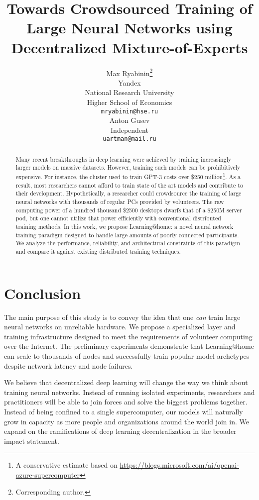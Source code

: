 \documentclass{article}
\title{Towards Crowdsourced Training of Large Neural Networks using Decentralized Mixture-of-Experts}
\author{%
  Max Ryabinin\thanks{Corresponding author.} \\
  Yandex\\
  National Research University\\
  Higher School of Economics\\
  \texttt{mryabinin@hse.ru} \\
  \And
  Anton Gusev \\
  Independent \\
  \texttt{uartman@mail.ru} \\
}
\begin{document}
\maketitle

\vspace{-4px}
\begin{abstract}
Many recent breakthroughs in deep learning were achieved by training increasingly larger models on massive datasets. However, training such models can be prohibitively expensive. For instance, the cluster used to train GPT-3 costs over \$250 million\footnote{\hspace{-2px}A conservative estimate based on \url{https://blogs.microsoft.com/ai/openai-azure-supercomputer}}. As a result, most researchers cannot afford to train state of the art models and contribute to their development. Hypothetically, a researcher could crowdsource the training of large neural networks with thousands of regular PCs provided by volunteers. The raw computing power of a hundred thousand \$2500 desktops dwarfs that of a \$250M server pod, but one cannot utilize that power efficiently with conventional distributed training methods. In this work, we propose Learning@home: a novel neural network training paradigm designed to handle large amounts of poorly connected participants. We analyze the performance, reliability, and architectural constraints of this paradigm and compare it against existing distributed training techniques.
\end{abstract}








\section{Conclusion}
The main purpose of this study is to convey the idea that one \textit{can} train large neural networks on unreliable hardware. We propose a specialized layer and training infrastructure designed to meet the requirements of volunteer computing over the Internet.
The preliminary experiments demonstrate that Learning@home can scale to thousands of nodes and successfully train popular model archetypes despite network latency and node failures.

We believe that decentralized deep learning will change the way we think about training neural networks. Instead of running isolated experiments, researchers and practitioners will be able to join forces and solve the biggest problems together. Instead of being confined to a single supercomputer, our models will naturally grow in capacity as more people and organizations around the world join in.
We expand on the ramifications of deep learning decentralization in the broader impact statement.
\end{document}
